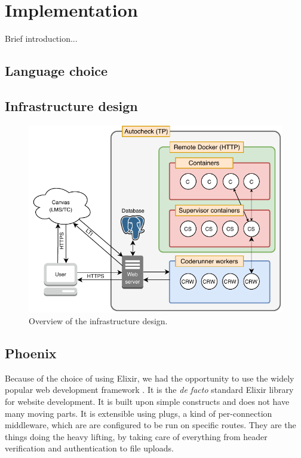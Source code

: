 \chapter{Implementation}

Brief introduction...

\section{Language choice}



\section{Infrastructure design}

\begin{figure}
    \centering
    \includegraphics{figure/Infrastructure.pdf}
    \caption{Overview of the infrastructure design.}
    \label{fig:infrastructure_design}
\end{figure}

\section{Phoenix}

Because of the choice of using Elixir, we had the opportunity to use the widely popular web development framework \cite{2018Phoenix}. It is the \emph{de facto} standard Elixir library for website development. It is built upon simple constructs and does not have many moving parts. It is extensible using plugs, a kind of per-connection middleware, which are are configured to be run on specific routes. They are the things doing the heavy lifting, by taking care of everything from header verification and authentication to file uploads.

